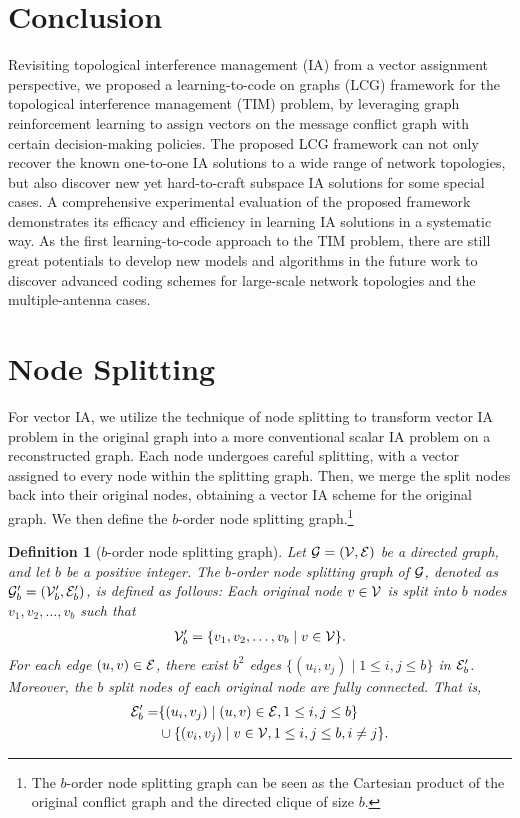 \documentclass[a4paper,journal]{IEEEtran}
\newtheorem{defn}{Definition}
\begin{document}
\section{Conclusion}
\label{sec:conclusion}
Revisiting topological interference management (IA) from a vector assignment perspective, we proposed a learning-to-code on graphs (LCG) framework for the topological interference management (TIM) problem, by leveraging graph reinforcement learning to assign vectors on the message conflict graph with certain decision-making policies. 
The proposed LCG framework can not only recover the known one-to-one IA solutions to a wide range of network topologies, but also discover new yet hard-to-craft subspace IA solutions for some special cases.
A comprehensive experimental evaluation of the proposed framework demonstrates its efficacy and efficiency in learning IA solutions in a systematic way.
As the first learning-to-code approach to the TIM problem, there are still great potentials to develop new models and algorithms in the future work to discover advanced coding schemes for large-scale network topologies and the multiple-antenna cases.




\appendices
\section{Node Splitting}\label{Node Splitting Appendix}
For vector IA, we utilize the technique of node splitting to transform vector IA problem in the original graph into a more conventional scalar IA problem on a reconstructed graph. Each node undergoes careful splitting, with a vector assigned to every node within the splitting graph. Then, we merge the split nodes back into their original nodes, obtaining a vector IA scheme for the original graph. We then define the $b$-order node splitting graph.\footnote{The $b$-order node splitting graph can be seen as the Cartesian product of the original conflict graph and the directed clique of size $b$.}

\begin{defn}[$b$-order node splitting graph]
Let ${\mathcal{G}} = ({\mathcal{V}}, {\mathcal{E}})$ be a directed graph, and let $b$ be a positive integer. The $b$-order node splitting graph of  ${\mathcal{G}}$, denoted as ${\mathcal{G}}_b' = ({\mathcal{V}}_b', {\mathcal{E}}_b')$, is defined as follows:
Each original node $v \in {\mathcal{V}}$ is split into $b$ nodes $v_1, v_2, \ldots, v_b$ such that 
\begin{align}
    {\mathcal{V}}_b' = \{v_1, v_2, \ldots, v_b \mid v \in {\mathcal{V}} \}.
\end{align}
For each edge $(u, v) \in {\mathcal{E}}$, there exist $b^2$ edges $\{(u_i, v_j) \mid 1 \leq i,j \leq b \}$ in ${\mathcal{E}}_b'$. Moreover, the $b$ split nodes of each original node are fully connected. That is, 
\begin{align}
    {\mathcal{E}}_b' = &\{(u_i, v_j) \mid (u, v) \in {\mathcal{E}}, 1 \leq i,j \leq b \} \\
    &\cup \{(v_i, v_j) \mid v \in {\mathcal{V}}, 1 \leq i,j \leq b, i \neq j\}.
\end{align}
\end{defn}
\end{document}
